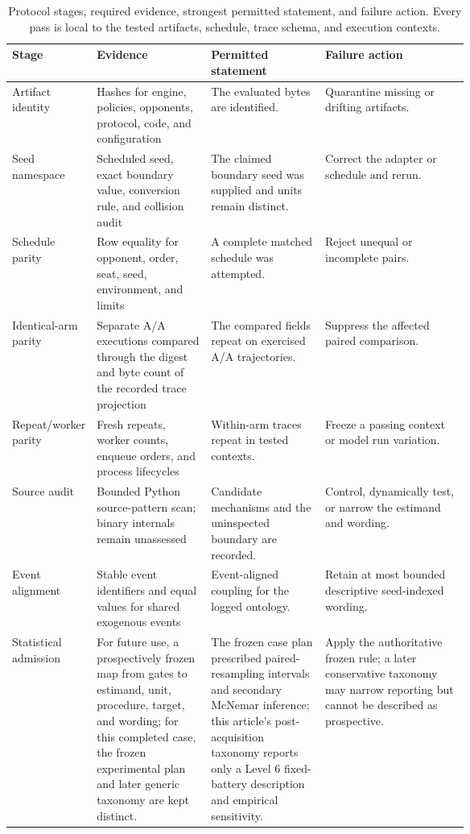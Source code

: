 \begin{table}[t]
\caption{Protocol stages, required evidence, strongest permitted statement, and failure action. Every pass is local to the tested artifacts, schedule, trace schema, and execution contexts.}
\label{tab:protocol}
\footnotesize
\begin{tabularx}{\linewidth}{>{\raggedright\arraybackslash}p{0.16\linewidth}>{\raggedright\arraybackslash}p{0.25\linewidth}>{\raggedright\arraybackslash}p{0.25\linewidth}>{\raggedright\arraybackslash}X}
\toprule
Stage & Evidence & Permitted statement & Failure action \\
\midrule
1 Artifact identity & Hashes for engine, policies, opponents, protocol, code, and configuration & The evaluated bytes are identified. & Quarantine missing or drifting artifacts. \\
2 Seed namespace & Scheduled seed, exact boundary value, conversion rule, and collision audit & The claimed boundary seed was supplied and units remain distinct. & Correct the adapter or schedule and rerun. \\
3 Schedule parity & Row equality for opponent, order, seat, seed, environment, and limits & A complete matched schedule was attempted. & Reject unequal or incomplete pairs. \\
4 Identical-arm parity & Separate A/A executions compared through the digest and byte count of the recorded trace projection & The compared fields repeat on exercised A/A trajectories. & Suppress the affected paired comparison. \\
5 Repeat/worker parity & Fresh repeats, worker counts, enqueue orders, and process lifecycles & Within-arm traces repeat in tested contexts. & Freeze a passing context or model run variation. \\
6 Source audit & Bounded Python source-pattern scan; binary internals remain unassessed & Candidate mechanisms and the uninspected boundary are recorded. & Control, dynamically test, or narrow the estimand and wording. \\
7 Event alignment & Stable event identifiers and equal values for shared exogenous events & Event-aligned coupling for the logged ontology. & Retain at most bounded descriptive seed-indexed wording. \\
8 Statistical admission & For future use, a prospectively frozen map from gates to estimand, unit, procedure, target, and wording; for this completed case, the frozen experimental plan and later generic taxonomy are kept distinct. & The frozen case plan prescribed paired-resampling intervals and secondary McNemar inference; this article's post-acquisition taxonomy reports only a Level 6 fixed-battery description and empirical sensitivity. & Apply the authoritative frozen rule; a later conservative taxonomy may narrow reporting but cannot be described as prospective. \\
\bottomrule
\end{tabularx}
\end{table}
